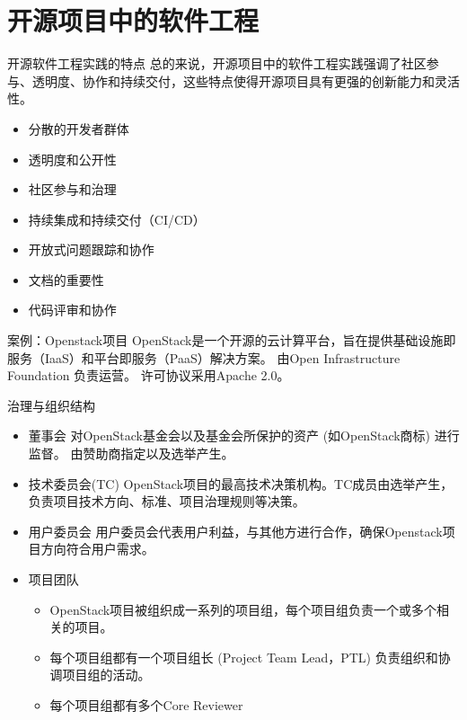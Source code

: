 \documentclass{beamer}
\begin{document}
\section{开源项目中的软件工程}
\label{sec:org4e077ee}
\begin{frame}[label={sec:orgfc3bc9a}]{开源软件工程实践的特点}
总的来说，开源项目中的软件工程实践强调了社区参与、透明度、协作和持续交付，这些特点使得开源项目具有更强的创新能力和灵活性。
\begin{itemize}
\item 分散的开发者群体
\item 透明度和公开性
\item 社区参与和治理
\item 持续集成和持续交付（CI/CD）
\item 开放式问题跟踪和协作
\item 文档的重要性
\item 代码评审和协作
\end{itemize}
\end{frame}
\begin{frame}[label={sec:orgfc9f4fd}]{案例：Openstack项目}
OpenStack是一个开源的云计算平台，旨在提供基础设施即服务（IaaS）和平台即服务（PaaS）解决方案。
由Open Infrastructure Foundation 负责运营。
许可协议采用Apache 2.0。
\end{frame}

\begin{frame}[label={sec:orgd7a7f74}]{治理与组织结构}
\begin{itemize}
\item 董事会
对OpenStack基金会以及基金会所保护的资产 (如OpenStack商标) 进行监督。
由赞助商指定以及选举产生。
\item 技术委员会(TC)
OpenStack项目的最高技术决策机构。TC成员由选举产生，负责项目技术方向、标准、项目治理规则等决策。
\item 用户委员会
用户委员会代表用户利益，与其他方进行合作，确保Openstack项目方向符合用户需求。
\item 项目团队
\begin{itemize}
\item OpenStack项目被组织成一系列的项目组，每个项目组负责一个或多个相关的项目。
\item 每个项目组都有一个项目组长 (Project Team Lead，PTL) 负责组织和协调项目组的活动。
\item 每个项目组都有多个Core Reviewer
\end{itemize}
\end{itemize}
\end{frame}
\end{document}
